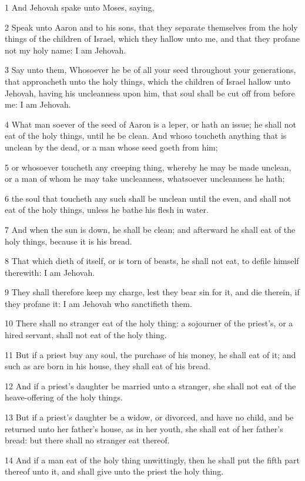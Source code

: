 \par 1 And Jehovah spake unto Moses, saying,
\par 2 Speak unto Aaron and to his sons, that they separate themselves from the holy things of the children of Israel, which they hallow unto me, and that they profane not my holy name: I am Jehovah.
\par 3 Say unto them, Whosoever he be of all your seed throughout your generations, that approacheth unto the holy things, which the children of Israel hallow unto Jehovah, having his uncleanness upon him, that soul shall be cut off from before me: I am Jehovah.
\par 4 What man soever of the seed of Aaron is a leper, or hath an issue; he shall not eat of the holy things, until he be clean. And whoso toucheth anything that is unclean by the dead, or a man whose seed goeth from him;
\par 5 or whosoever toucheth any creeping thing, whereby he may be made unclean, or a man of whom he may take uncleanness, whatsoever uncleanness he hath;
\par 6 the soul that toucheth any such shall be unclean until the even, and shall not eat of the holy things, unless he bathe his flesh in water.
\par 7 And when the sun is down, he shall be clean; and afterward he shall eat of the holy things, because it is his bread.
\par 8 That which dieth of itself, or is torn of beasts, he shall not eat, to defile himself therewith: I am Jehovah.
\par 9 They shall therefore keep my charge, lest they bear sin for it, and die therein, if they profane it: I am Jehovah who sanctifieth them.
\par 10 There shall no stranger eat of the holy thing: a sojourner of the priest's, or a hired servant, shall not eat of the holy thing.
\par 11 But if a priest buy any soul, the purchase of his money, he shall eat of it; and such as are born in his house, they shall eat of his bread.
\par 12 And if a priest's daughter be married unto a stranger, she shall not eat of the heave-offering of the holy things.
\par 13 But if a priest's daughter be a widow, or divorced, and have no child, and be returned unto her father's house, as in her youth, she shall eat of her father's bread: but there shall no stranger eat thereof.
\par 14 And if a man eat of the holy thing unwittingly, then he shall put the fifth part thereof unto it, and shall give unto the priest the holy thing.
